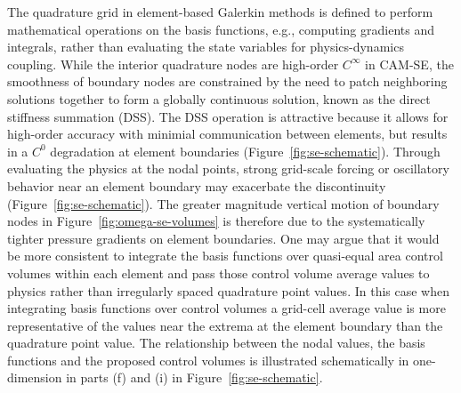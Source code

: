 \documentclass[twocol]{ametsoc}
\begin{document}
The quadrature grid in element-based Galerkin methods is defined to perform mathematical operations on the basis functions, e.g., computing gradients and integrals, rather than evaluating the state variables for physics-dynamics coupling. While the interior quadrature nodes are high-order $C^{\infty}$ in CAM-SE, the smoothness of boundary nodes are constrained by the need to patch neighboring solutions together to form a globally continuous solution, known as the direct stiffness summation (DSS). The DSS operation is attractive because it allows for high-order accuracy with minimial communication between elements, but results in a $C^0$ degradation at element boundaries (Figure~\ref{fig:se-schematic}). Through evaluating the physics at the nodal points, strong grid-scale forcing or oscillatory behavior near an element boundary may exacerbate the discontinuity (Figure~\ref{fig:se-schematic}). The greater magnitude vertical motion of boundary nodes in Figure~\ref{fig:omega-se-volumes} is therefore due to the systematically tighter pressure gradients on element boundaries. One may argue that it would be more consistent to integrate the basis functions over quasi-equal area control volumes within each element and pass those control volume average values to physics rather than irregularly spaced quadrature point values. In this case when integrating basis functions over control volumes a grid-cell average value is more representative of the values near the extrema at the element boundary than the quadrature point value. The relationship between the nodal values, the basis functions and the proposed control volumes is illustrated schematically in one-dimension in parts (f) and (i) in Figure~\ref{fig:se-schematic}. 
\end{document}
